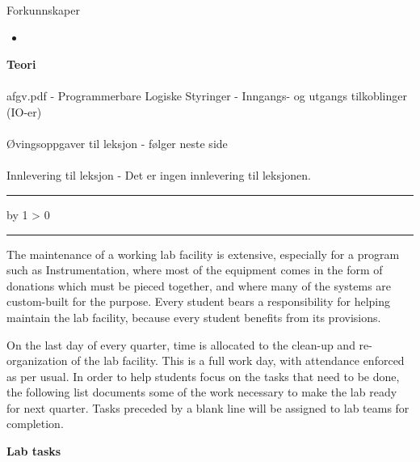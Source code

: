 \documentclass[12pt,a4paper]{article}
\def\oppgave{
            \advance\questnum by 1
            \ifnum \questnum > 0
                 \hrule
                 \vskip 3pt
                 \leftline{Oppgave \the\questnum}
                 \vskip 3pt \fi}
\begin{document}
	Forkunnskaper

	\begin{itemize}[noitemsep]
		\item 

	\end{itemize}
\textbf{Teori}\\\\
afgv.pdf - Programmerbare Logiske Styringer - Inngangs- og utgangs tilkoblinger (IO-er)\\\\
Øvingsoppgaver til leksjon - følger neste side\\\\
Innlevering til leksjon - Det er ingen innlevering til leksjonen. 
\bigskip 
\hrule
\vfil \eject
\vfil \eject

\oppgave{} 

The maintenance of a working lab facility is extensive, especially for a program such as Instrumentation, where most of the equipment comes in the form of donations which must be pieced together, and where many of the systems are custom-built for the purpose.  Every student bears a responsibility for helping maintain the lab facility, because every student benefits from its provisions.

On the last day of every quarter, time is allocated to the clean-up and re-organization of the lab facility.  This is a full work day, with attendance enforced as per usual.  In order to help students focus on the tasks that need to be done, the following list documents some of the work necessary to make the lab ready for next quarter.  Tasks preceded by a blank line will be assigned to lab teams for completion.

\vskip 10pt

\noindent
{\bf Lab tasks}
\end{document}
